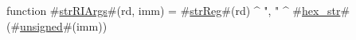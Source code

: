 function #\hyperref[sailMIPSzstrRIArgs]{strRIArgs}#(rd, imm) = #\hyperref[sailMIPSzstrReg]{strReg}#(rd) ^ ", " ^ #\hyperref[sailMIPSzhexzystr]{hex\_str}#(#\hyperref[sailMIPSzunsigned]{unsigned}#(imm))
